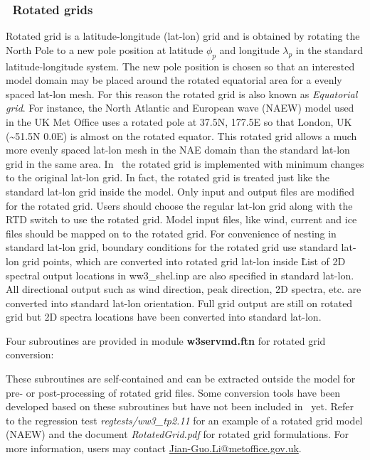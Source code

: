 \vssub
\subsubsection{~Rotated grids} \label{sub:num_space_rotagrid}

\noindent
Rotated grid is a latitude-longitude (lat-lon) grid and is obtained by
rotating the North Pole to a new pole position at latitude $\phi_{p}$ and
longitude $\lambda_{p}$ in the standard latitude-longitude system.  The new
pole position is chosen so that an interested model domain may be placed
around the rotated equatorial area for a evenly spaced lat-lon mesh. For this
reason the rotated grid is also known as \emph{Equatorial grid}. For instance,
the North Atlantic and European wave (NAEW) model used in the UK Met Office
uses a rotated pole at 37.5N, 177.5E so that London, UK
(\textasciitilde{}51.5N 0.0E) is almost on the rotated equator. This rotated
grid allows a much more evenly spaced lat-lon mesh in the NAE domain than the
standard lat-lon grid in the same area. In \ws\, the rotated grid is
implemented with minimum changes to the original lat-lon grid. In fact, the
rotated grid is treated just like the standard lat-lon grid inside the
model. Only input and output files are modified for the rotated grid. Users
should choose the regular lat-lon grid along with the RTD switch to use the
rotated grid. Model input files, like wind, current and ice files should be
mapped on to the rotated grid. For convenience of nesting in standard lat-lon
grid, boundary conditions for the rotated grid use standard lat-lon grid
points, which are converted into rotated grid lat-lon inside \ws\. List of 2D
spectral output locations in ww3\_shel.inp are also specified in standard
lat-lon. All directional output such as wind direction, peak direction, 2D
spectra, etc. are converted into standard lat-lon orientation. Full grid
output are still on rotated grid but 2D spectra locations have been converted
into standard lat-lon.

Four subroutines are provided in module {\bf w3servmd.ftn} for rotated grid
conversion:
\begin{vlist}
\end{vlist}
These subroutines are self-contained and can be extracted outside the model
for pre- or post-processing of rotated grid files. Some conversion tools have
been developed based on these subroutines but have not been included in \ws\
yet. Refer to the regression test \emph{regtests/ww3\_tp2.11} for an example
of a rotated grid model (NAEW) and the document \emph{RotatedGrid.pdf} for
rotated grid formulations. For more information, users may contact
\url{Jian-Guo.Li@metoffice.gov.uk}.
